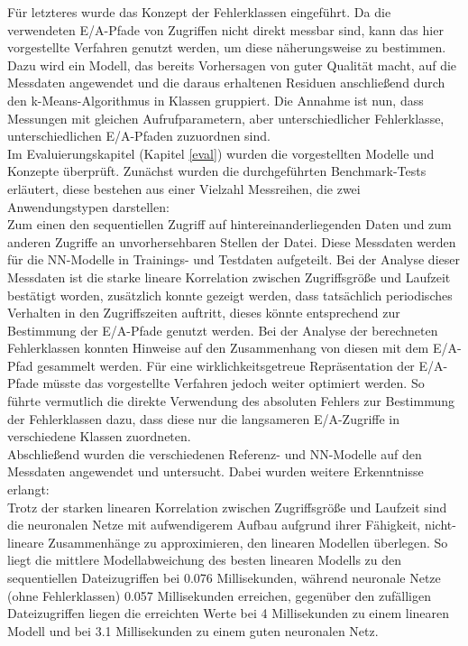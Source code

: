 \documentclass[
	12pt,
	a4paper,
	BCOR10mm,
	DIV14,
	listof=totoc,
	bibliography=totoc,
	headsepline
]{scrreprt}
\begin{document}
Für letzteres wurde das Konzept der Fehlerklassen eingeführt. Da die verwendeten E/A-Pfade von Zugriffen nicht direkt messbar sind, kann das hier vorgestellte Verfahren genutzt werden, um diese näherungsweise zu bestimmen. Dazu wird ein Modell, das bereits Vorhersagen von guter Qualität macht, auf die Messdaten angewendet und die daraus erhaltenen Residuen anschließend durch den k-Means-Algorithmus in Klassen gruppiert. Die Annahme ist nun, dass Messungen mit gleichen Aufrufparametern, aber unterschiedlicher Fehlerklasse, unterschiedlichen E/A-Pfaden zuzuordnen sind.\\
Im Evaluierungskapitel (Kapitel \ref{eval}) wurden die vorgestellten Modelle und Konzepte überprüft.
Zunächst wurden die durchgeführten Benchmark-Tests erläutert, diese bestehen aus einer Vielzahl Messreihen, die zwei Anwendungstypen darstellen:\\
Zum einen den sequentiellen Zugriff auf hintereinanderliegenden Daten und zum anderen Zugriffe an unvorhersehbaren Stellen der Datei. Diese Messdaten werden für die NN-Modelle in Trainings- und Testdaten aufgeteilt.
Bei der Analyse dieser Messdaten ist die starke lineare Korrelation zwischen Zugriffsgröße und Laufzeit bestätigt worden, zusätzlich konnte gezeigt werden, dass tatsächlich periodisches Verhalten in den Zugriffszeiten auftritt, dieses könnte entsprechend zur Bestimmung der E/A-Pfade genutzt werden.
Bei der Analyse der berechneten Fehlerklassen konnten Hinweise auf den Zusammenhang von diesen mit dem E/A-Pfad gesammelt werden. Für eine wirklichkeitsgetreue Repräsentation der E/A-Pfade müsste das vorgestellte Verfahren jedoch weiter optimiert werden. 
So führte vermutlich die direkte Verwendung des absoluten Fehlers zur Bestimmung der Fehlerklassen dazu, dass diese nur die langsameren E/A-Zugriffe in verschiedene Klassen zuordneten.\\
Abschließend wurden die verschiedenen Referenz- und NN-Modelle auf den Messdaten angewendet und untersucht. Dabei wurden weitere Erkenntnisse erlangt:\\
Trotz der starken linearen Korrelation zwischen Zugriffsgröße und Laufzeit sind die neuronalen Netze mit aufwendigerem Aufbau aufgrund ihrer Fähigkeit, nicht-lineare Zusammenhänge zu approximieren, den linearen Modellen überlegen. So liegt die mittlere Modellabweichung des besten linearen Modells zu den sequentiellen Dateizugriffen bei 0.076 Millisekunden, während neuronale Netze (ohne Fehlerklassen) 0.057 Millisekunden erreichen, gegenüber den zufälligen Dateizugriffen liegen die erreichten Werte bei 4 Millisekunden zu einem linearen Modell und bei 3.1 Millisekunden zu einem guten neuronalen Netz.
\end{document}
